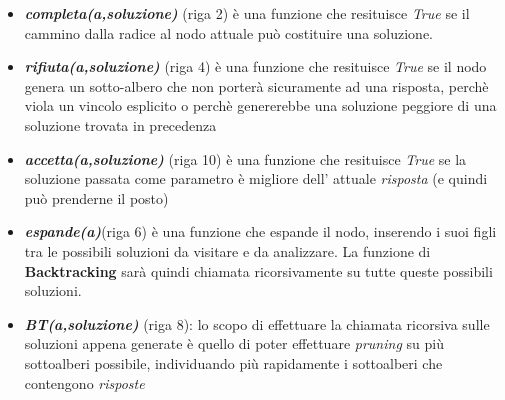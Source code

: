 \documentclass[a4paper]{article}
\newcommand{\imp}[1]{\textbf{\textit{#1}}}
\begin{document}
\begin{itemize}
	\item \imp{completa(a,soluzione)} (riga 2) è una funzione che resituisce \textit{True} se il cammino dalla radice al nodo attuale può costituire una soluzione.
	\item \imp{rifiuta(a,soluzione)} (riga 4) è una funzione che resituisce \textit{True} se il nodo genera un sotto-albero che non porterà sicuramente ad una risposta, perchè viola un vincolo esplicito o perchè genererebbe una soluzione peggiore di una soluzione trovata in precedenza
	\item \imp{accetta(a,soluzione)} (riga 10) è una funzione che resituisce \textit{True} se la soluzione passata come parametro è migliore dell' attuale \textit{risposta} (e quindi può prenderne il posto)
	\item \imp{espande(a)}(riga 6) è una funzione che espande il nodo, inserendo i suoi figli tra le possibili soluzioni da visitare e da analizzare. La funzione di \textbf{Backtracking} sarà quindi chiamata ricorsivamente su tutte queste possibili soluzioni.
	\item \imp{BT(a,soluzione)} (riga 8): lo scopo di effettuare la chiamata ricorsiva sulle soluzioni appena generate è quello di poter effettuare \textit{pruning} su più sottoalberi possibile, individuando più rapidamente i sottoalberi che contengono \textit{risposte}
\end{itemize}
\end{document}
